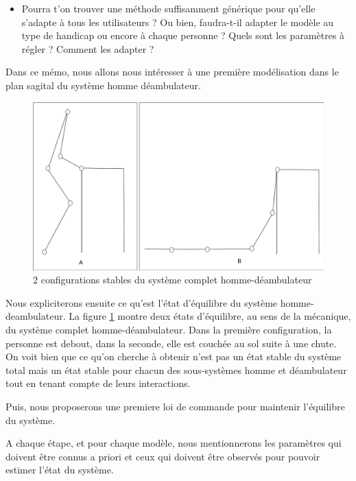 \documentclass[a4paper, 10pt ]{article}
\begin{document}
\begin{itemize}
\item Pourra t'on trouver une méthode suffisamment générique pour qu'elle s'adapte à tous les utilisateurs ? Ou bien, faudra-t-il adapter le modèle au type de handicap ou encore à chaque personne ?  Quels sont les paramètres à régler ? Comment les adapter ?


\end{itemize}


Dans ce mémo, nous allons nous intéresser à une première modélisation dans le plan sagital du système homme déambulateur. 

\begin{figure}[h]
\centering
\includegraphics[width=0.6\columnwidth]{images/model/positionStable.eps}
\caption{2 configurations stables du système complet homme-déambulateur}
\label{fig:positionEquilibre}
\end{figure}


Nous expliciterons ensuite ce qu'est l'état d'équilibre du système homme-deambulateur. La figure \ref{fig:positionEquilibre} montre deux états d'équilibre, au sens de la mécanique, du système complet homme-déambulateur. Dans la première configuration, la personne est debout, dans la seconde, elle est couchée au sol suite à une chute. On voit bien que ce qu'on cherche à obtenir n'est pas un état stable du système total mais un état stable pour chacun des sous-systèmes homme et  déambulateur tout en tenant compte de leurs interactions.


Puis, nous proposerons une premiere loi de commande pour maintenir l'équilibre du système.

A chaque étape, et pour chaque modèle, nous mentionnerons les paramètres qui doivent être connus a priori et ceux qui doivent être observés pour pouvoir estimer l'état du système.
\end{document}
